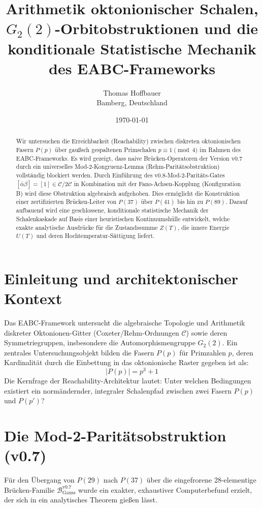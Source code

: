 \documentclass[11pt,a4paper]{article}
\title{\textbf{Arithmetik oktonionischer Schalen, $G_2(2)$-Orbitobstruktionen und die konditionale Statistische Mechanik des EABC-Frameworks}}
\author{Thomas Hoffbauer \\ \small Bamberg, Deutschland}
\date{\today}
\begin{document}
	
	\maketitle
	
	\begin{abstract}
		Wir untersuchen die Erreichbarkeit (Reachability) zwischen diskreten oktonionischen Fasern $P(p)$ über gaußsch gespaltenen Primschalen $p \equiv 1 \pmod 4$ im Rahmen des EABC-Frameworks. Es wird gezeigt, dass naive Brücken-Operatoren der Version v0.7 durch ein universelles Mod-2-Kongruenz-Lemma (Rehm-Paritätsobstruktion) vollständig blockiert werden. Durch Einführung des v0.8-Mod-2-Paritäts-Gates $[\bar{\alpha}\beta] = [1] \in \mathcal{C}/2\mathcal{C}$ in Kombination mit der Fano-Achsen-Kopplung (Konfiguration B) wird diese Obstruktion algebraisch aufgehoben. Dies ermöglicht die Konstruktion einer zertifizierten Brücken-Leiter von $P(37)$ über $P(41)$ bis hin zu $P(89)$. Darauf aufbauend wird eine geschlossene, konditionale statistische Mechanik der Schalenkaskade auf Basis einer heuristischen Kontinuumshülle entwickelt, welche exakte analytische Ausdrücke für die Zustandssumme $Z(T)$, die innere Energie $U(T)$ und deren Hochtemperatur-Sättigung liefert.
	\end{abstract}
	
	\section{Einleitung und architektonischer Kontext}
	
	Das EABC-Framework untersucht die algebraische Topologie und Arithmetik diskreter Oktonionen-Gitter (Coxeter/Rehm-Ordnungen $\mathcal{C}$) sowie deren Symmetriegruppen, insbesondere die Automorphismengruppe $G_2(2)$. Ein zentrales Untersuchungsobjekt bilden die Fasern $P(p)$ für Primzahlen $p$, deren Kardinalität durch die Einbettung in das oktonionische Raster gegeben ist als:
	\begin{equation}
		|P(p)| = p^3 + 1
	\end{equation}
	Die Kernfrage der Reachability-Architektur lautet: Unter welchen Bedingungen existiert ein normändernder, integraler Schalenpfad zwischen zwei Fasern $P(p)$ und $P(p')$?
	
	\section{Die Mod-2-Paritätsobstruktion (v0.7)}
	
	Für den Übergang von $P(29)$ nach $P(37)$ über die eingefrorene 28-elementige Brücken-Familie $\mathcal{B}_{\text{Gauss}}^{\text{v0.7}}$ wurde ein exakter, exhaustiver Computerbefund erzielt, der sich in ein analytisches Theorem gießen lässt.
	
\end{document}

